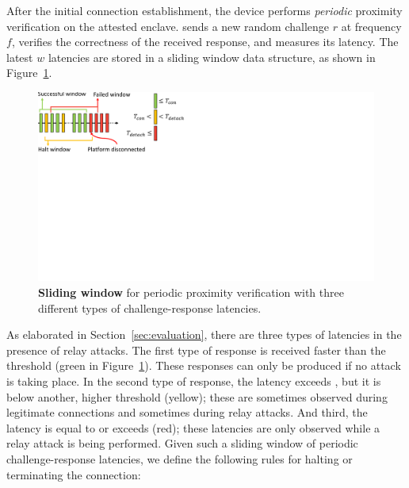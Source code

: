 
After the initial connection establishment, the \device device performs \emph{periodic} proximity verification on the attested enclave. \device sends a new random challenge $r$ at frequency $f$, verifies the correctness of the received response, and measures its latency. The latest $w$ latencies are stored in a sliding window data structure, as shown in Figure~\ref{fig:slidingWindow}.

\begin{figure}[t]
  \centering
   \includegraphics[trim={0 12.5cm 19cm 0}, clip, width=0.7\linewidth]{chapters/ProximiTEE/figures/SlidingWindow.pdf}
    \caption[\name periodic proximity verification]{\textbf{Sliding window} for periodic proximity verification with three different types of challenge-response latencies.}
    \label{fig:slidingWindow}
\end{figure}

As elaborated in Section~\ref{sec:evaluation}, there are three types of latencies in the presence of relay attacks. The first type of response is received faster than the threshold \connect (green in Figure~\ref{fig:slidingWindow}). These responses can only be produced if no attack is taking place. In the second type of response, the latency exceeds \connect, but it is below another, higher threshold \detach (yellow); these are sometimes observed during legitimate connections and sometimes during relay attacks. And third, the latency is equal to or exceeds \detach (red); these latencies are only observed while a relay attack is being performed. Given such a sliding window of periodic challenge-response latencies, we define the following rules for halting or terminating the connection:

